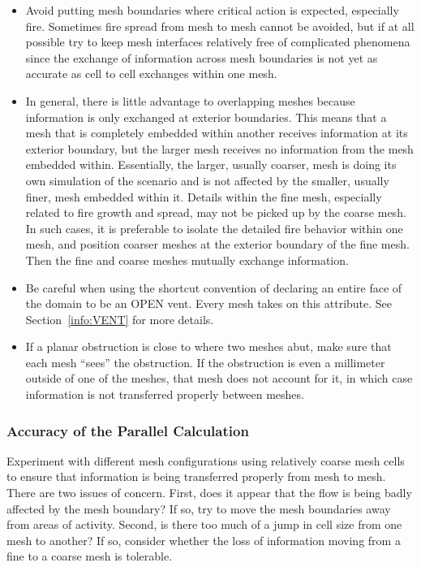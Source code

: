 \documentclass[11pt]{book}
\begin{document}
\begin{itemize}
\item Avoid putting mesh boundaries where critical action is expected,
especially fire. Sometimes fire spread from mesh to mesh cannot be
avoided, but if at all possible try to keep mesh interfaces relatively
free of complicated phenomena since the exchange of information across
mesh boundaries is not yet as accurate as cell to cell exchanges within one
mesh.

\item In general, there is little advantage to overlapping meshes because
information is only exchanged at exterior boundaries. This means that a mesh that is completely embedded within
another receives information at its exterior boundary, but the larger
mesh receives no information from the mesh embedded within. Essentially,
the larger, usually coarser, mesh is doing its own simulation of the scenario
and is not affected by the smaller, usually finer, mesh embedded within it.
Details within the fine mesh, especially related to fire growth and spread,
may not be picked up by the coarse mesh. In such cases, it is preferable to
isolate the detailed fire behavior within one mesh, and position coarser
meshes at the exterior boundary of the fine mesh. Then the fine and coarse
meshes mutually exchange information.

\item Be careful when using the shortcut convention of declaring an
entire face of the domain to be an {\ct OPEN} vent. Every mesh
takes on this attribute. See Section~\ref{info:VENT} for more details.

\item If a planar obstruction is close to where two meshes abut, make sure that each
mesh ``sees'' the obstruction. If the obstruction is even a millimeter outside of one
of the meshes, that mesh does not account for it, in which case information is not
transferred properly between meshes.
\end{itemize}


\subsubsection{Accuracy of the Parallel Calculation}

Experiment with different mesh configurations using relatively
coarse mesh cells to ensure that information is being transferred
properly from mesh to mesh. There are two issues of concern. First,
does it appear that the flow is being badly affected by the mesh boundary? If so,
try to move the mesh boundaries away from areas of activity. Second,
is there too much of a jump in cell size from one mesh to another? If so, consider
whether the loss of information moving from a fine to a coarse mesh is tolerable.
\end{document}
